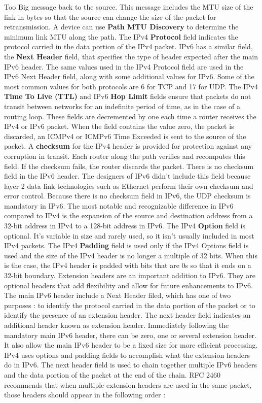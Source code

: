 \documentclass[11pt]{article}
\begin{document}
Too Big message back to the source. This message includes the MTU size of the link in bytes so that the source can change the size of the packet for retransmission. A device can use \textbf{Path MTU Discovery} to determine the minimum link MTU along the path. The IPv4 \textbf{Protocol} field indicates the protocol carried in the data portion of the IPv4 packet. IPv6 has a similar field, the \textbf{Next Header} field, that specifies the type of header expected after the main IPv6 header. The same values used in the IPv4 Protocol field are used in the IPv6 Next Header field, along with some additional values for IPv6. Some of the most common values for both protocols are 6 for TCP and 17 for UDP. The IPv4 \textbf{Time To Live (TTL)} and IPv6 \textbf{Hop Limit} fields ensure that packets do not transit between networks for an indefinite period of time, as in the case of a routing loop. These fields are decremented by one each time a router receives the IPv4 or IPv6 packet. When the field contains the value zero, the packet is discarded, an ICMPv4 or ICMPv6 Time Exceeded is sent to the source of the packet. A \textbf{checksum} for the IPv4 header is provided for protection against any corruption in transit. Each router along the path verifies and recomputes this field. If the checksum fails, the router discards the packet. There is no checksum field in the IPv6 header. The designers of IPv6 didn't include this field because layer 2 data link technologies such as Ethernet perform their own checksum and error control. Because there is no checksum field in IPv6, the UDP checksum is mandatory in IPv6. The most notable and recognizable difference in IPv6 compared to IPv4 is the expansion of the source and destination address from a 32-bit address in IPv4 to a 128-bit address in IPv6. The IPv4 \textbf{Option} field is optional. It's variable in size and rarely used, so it isn't usually included in most IPv4 packets. The IPv4 \textbf{Padding} field is used only if the IPv4 Options field is used and the size of the IPv4 header is no longer a multiple of 32 bits. When this is the case, the IPv4 header is padded with bits that are 0s so that it ends on a 32-bit boundary. Extension headers are an important addition to IPv6. They are optional headers that add flexibility and allow for future enhancements to IPv6. The main IPv6 header include a Next Header filed, which has one of two purposes : to identify the protocol carried in the data portion of the packet or to identify the presence of an extension header. The next header field indicates an additional header known as extension header. Immediately following the mandatory main IPv6 header, there can be zero, one or several extension header. It also allow the main IPv6 header to be a fixed size for more efficient processing. IPv4 uses options and padding fields to accomplish what the extension headers do in IPv6. The next header field is used to chain together multiple IPv6 headers and the data portion of the packet at the end of the chain. RFC 2460 recommends that when multiple extension headers are used in the same packet, those headers should appear in the following order : 
\end{document}
